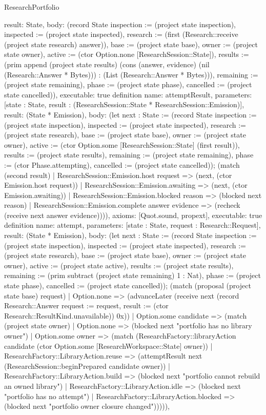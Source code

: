 \begin{lexlean}{ResearchPortfolio}
\begin{semanticmodule}
{ result: State,
 body: (record State {inspection := (project state inspection), inspected := (project state inspected), research := (first (Research::receive (project state research) answer)), base := (project state base), owner := (project state owner), active := (ctor Option.none [ResearchSession::State]), results := (prim append (project state results) (cons (answer, evidence) (nil (Research::Answer * Bytes))) : (List (Research::Answer * Bytes))), remaining := (project state remaining), phase := (project state phase), cancelled := (project state cancelled)}),
 executable: true
}
definition{
 name: attemptResult,
 parameters: [state : State, result : (ResearchSession::State * ResearchSession::Emission)],
 result: (State * Emission),
 body: (let next : State := (record State {inspection := (project state inspection), inspected := (project state inspected), research := (project state research), base := (project state base), owner := (project state owner), active := (ctor Option.some [ResearchSession::State] (first result)), results := (project state results), remaining := (project state remaining), phase := (ctor Phase.attempting), cancelled := (project state cancelled)}); (match (second result) | ResearchSession::Emission.host request => (next, (ctor Emission.host request)) | ResearchSession::Emission.awaiting => (next, (ctor Emission.awaiting)) | ResearchSession::Emission.blocked reason => (blocked next reason) | ResearchSession::Emission.complete answer evidence => (recheck (receive next answer evidence)))),
 axioms: [Quot.sound, propext],
 executable: true
}
definition{
 name: attempt,
 parameters: [state : State, request : Research::Request],
 result: (State * Emission),
 body: (let next : State := (record State {inspection := (project state inspection), inspected := (project state inspected), research := (project state research), base := (project state base), owner := (project state owner), active := (project state active), results := (project state results), remaining := (prim subtract (project state remaining) 1 : Nat), phase := (project state phase), cancelled := (project state cancelled)}); (match (proposal (project state base) request) | Option.none => (advanceLater (receive next (record Research::Answer {request := request, result := (ctor Research::ResultKind.unavailable)}) 0x)) | Option.some candidate => (match (project state owner) | Option.none => (blocked next "portfolio has no library owner") | Option.some owner => (match (ResearchFactory::libraryAction candidate (ctor Option.some [ResearchWorkspace::State] owner)) | ResearchFactory::LibraryAction.reuse => (attemptResult next (ResearchSession::beginPrepared candidate owner)) | ResearchFactory::LibraryAction.build => (blocked next "portfolio cannot rebuild an owned library") | ResearchFactory::LibraryAction.idle => (blocked next "portfolio has no attempt") | ResearchFactory::LibraryAction.blocked => (blocked next "portfolio owner closure changed"))))),
}
\end{semanticmodule}
\end{lexlean}
